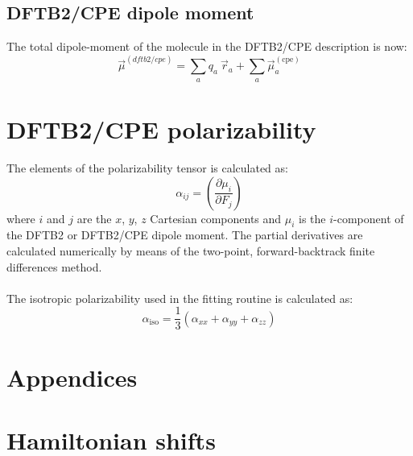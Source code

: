 \documentclass{article}
\numberwithin{equation}{section}
\begin{document}
\subsection{DFTB2/CPE dipole moment}
The total dipole-moment of the molecule in the DFTB2/CPE description is now:
\begin{equation}
    \vec{\mu}^{(dftb2/cpe)} = \sum_a q_a\ \vec{r}_a + \sum_a \vec{\mu}^{\mathrm{(cpe)}}_a
\end{equation}


\clearpage
\section{DFTB2/CPE polarizability}
The elements of the polarizability tensor is calculated as:
\begin{equation}
    \alpha_{ij} = \left(\frac{\partial \mu_i }{\partial F_j}\right)
\end{equation}
where $i$ and $j$ are the $x$, $y$, $z$ Cartesian components and $\mu_i$ is the $i$-component of the DFTB2 or DFTB2/CPE dipole moment.
The partial derivatives are calculated numerically by means of the two-point, forward-backtrack finite differences method.
\\\\The isotropic polarizability used in the fitting routine is calculated as:
\begin{equation}
    \alpha_{\mathrm{iso}} = \frac{1}{3} \left( \alpha_{xx} +\alpha_{yy} + \alpha_{zz}  \right)
\end{equation}






\clearpage
\section*{Appendices}
\appendix
\section{Hamiltonian shifts}
\end{document}
